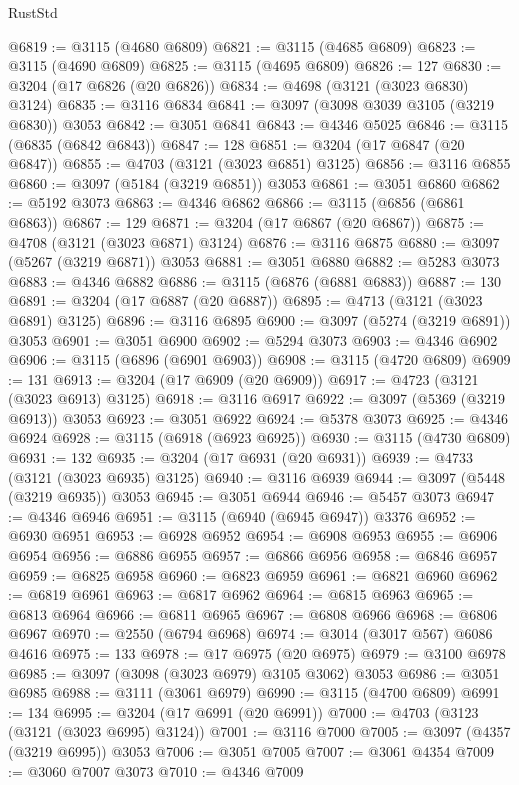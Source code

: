 \begin{lexlean}{RustStd}
\begin{coremodule}
{\begin{coremodule}
{{{{{{{{{{{{{{{{{{{{{{{{{{{{{{{{@6819 := @3115 (@4680 @6809)
@6821 := @3115 (@4685 @6809)
@6823 := @3115 (@4690 @6809)
@6825 := @3115 (@4695 @6809)
@6826 := 127
@6830 := @3204 (@17 @6826 (@20 @6826))
@6834 := @4698 (@3121 (@3023 @6830) @3124)
@6835 := @3116 @6834
@6841 := @3097 (@3098 @3039 @3105 (@3219 @6830)) @3053
@6842 := @3051 @6841
@6843 := @4346 @5025
@6846 := @3115 (@6835 (@6842 @6843))
@6847 := 128
@6851 := @3204 (@17 @6847 (@20 @6847))
@6855 := @4703 (@3121 (@3023 @6851) @3125)
@6856 := @3116 @6855
@6860 := @3097 (@5184 (@3219 @6851)) @3053
@6861 := @3051 @6860
@6862 := @5192 @3073
@6863 := @4346 @6862
@6866 := @3115 (@6856 (@6861 @6863))
@6867 := 129
@6871 := @3204 (@17 @6867 (@20 @6867))
@6875 := @4708 (@3121 (@3023 @6871) @3124)
@6876 := @3116 @6875
@6880 := @3097 (@5267 (@3219 @6871)) @3053
@6881 := @3051 @6880
@6882 := @5283 @3073
@6883 := @4346 @6882
@6886 := @3115 (@6876 (@6881 @6883))
@6887 := 130
@6891 := @3204 (@17 @6887 (@20 @6887))
@6895 := @4713 (@3121 (@3023 @6891) @3125)
@6896 := @3116 @6895
@6900 := @3097 (@5274 (@3219 @6891)) @3053
@6901 := @3051 @6900
@6902 := @5294 @3073
@6903 := @4346 @6902
@6906 := @3115 (@6896 (@6901 @6903))
@6908 := @3115 (@4720 @6809)
@6909 := 131
@6913 := @3204 (@17 @6909 (@20 @6909))
@6917 := @4723 (@3121 (@3023 @6913) @3125)
@6918 := @3116 @6917
@6922 := @3097 (@5369 (@3219 @6913)) @3053
@6923 := @3051 @6922
@6924 := @5378 @3073
@6925 := @4346 @6924
@6928 := @3115 (@6918 (@6923 @6925))
@6930 := @3115 (@4730 @6809)
@6931 := 132
@6935 := @3204 (@17 @6931 (@20 @6931))
@6939 := @4733 (@3121 (@3023 @6935) @3125)
@6940 := @3116 @6939
@6944 := @3097 (@5448 (@3219 @6935)) @3053
@6945 := @3051 @6944
@6946 := @5457 @3073
@6947 := @4346 @6946
@6951 := @3115 (@6940 (@6945 @6947)) @3376
@6952 := @6930 @6951
@6953 := @6928 @6952
@6954 := @6908 @6953
@6955 := @6906 @6954
@6956 := @6886 @6955
@6957 := @6866 @6956
@6958 := @6846 @6957
@6959 := @6825 @6958
@6960 := @6823 @6959
@6961 := @6821 @6960
@6962 := @6819 @6961
@6963 := @6817 @6962
@6964 := @6815 @6963
@6965 := @6813 @6964
@6966 := @6811 @6965
@6967 := @6808 @6966
@6968 := @6806 @6967
@6970 := @2550 (@6794 @6968)
@6974 := @3014 (@3017 @567) @6086 @4616
@6975 := 133
@6978 := @17 @6975 (@20 @6975)
@6979 := @3100 @6978
@6985 := @3097 (@3098 (@3023 @6979) @3105 @3062) @3053
@6986 := @3051 @6985
@6988 := @3111 (@3061 @6979)
@6990 := @3115 (@4700 @6809)
@6991 := 134
@6995 := @3204 (@17 @6991 (@20 @6991))
@7000 := @4703 (@3123 (@3121 (@3023 @6995) @3124))
@7001 := @3116 @7000
@7005 := @3097 (@4357 (@3219 @6995)) @3053
@7006 := @3051 @7005
@7007 := @3061 @4354
@7009 := @3060 @7007 @3073
@7010 := @4346 @7009
}}}}}}}}}}}}}}}}}}}}}}}}}}}}}}}}
\end{coremodule}}
\end{coremodule}
\end{lexlean}
